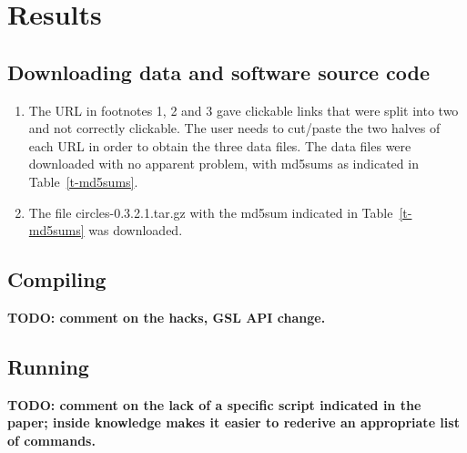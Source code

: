 \section{Results}

\subsection{Downloading data and software source code}

\begin{enumerate}
\item
  The URL in footnotes 1, 2 and 3\supercite{RBG08} gave clickable links that were split into
  two and not correctly clickable. The user needs to cut/paste the two halves of each URL
  in order to obtain the three data files. The data files were downloaded with no apparent
  problem, with md5sums as indicated in Table~\ref{t-md5sums}.
\item
  The file {\sc circles-0.3.2.1.tar.gz} with the md5sum indicated in Table~\ref{t-md5sums} was
  downloaded.
\end{enumerate}

\subsection{Compiling}

\textbf{TODO: comment on the hacks, GSL API change.}

\subsection{Running}

\textbf{TODO: comment on the lack of a specific script indicated in the paper; inside knowledge makes
  it easier to rederive an appropriate list of commands.}
